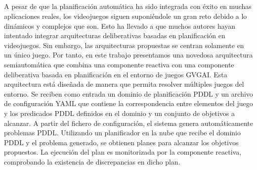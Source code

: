 


\cleardoublepage
\thispagestyle{empty}


\begin{center}
{\large\bfseries \titulo}\\
\end{center}
\begin{center}
\autor\\
\end{center}

\\

\vspace{0.7cm}
\\

A pesar de que la planificación automática ha sido integrada con éxito en muchas aplicaciones
reales, los videojuegos siguen suponiéndole un gran reto debido a lo dinámicos y complejos que son.
Esto ha llevado a que muchos autores hayan intentado integrar arquitecturas deliberativas basadas en
planificación en videojuegos. Sin embargo, las arquitecturas propuestas se centran solamente en un único juego.
Por tanto, en este trabajo presentamos una novedosa arquitectura semiautomática que combina una componente
reactiva con una componente deliberativa basada en planificación en el entorno de juegos GVGAI.
Esta arquitectura está diseñada de manera que permita resolver múltiples juegos del entorno.
Se reciben como entrada un dominio de planificación PDDL y un archivo de configuración YAML que contiene la
correspondencia entre elementos del juego y los predicados PDDL definidos en el dominio y un conjunto de objetivos a
alcanzar. A partir del fichero de configuración, el sistema genera automáticamente problemas PDDL. Utilizando
un planificador en la nube que recibe el dominio PDDL y el problema generado, se obtienen planes para alcanzar
los objetivos propuestos. La ejecución del plan es monitorizada por la componente reactiva, comprobando la existencia
de discrepancias en dicho plan.

\cleardoublepage


